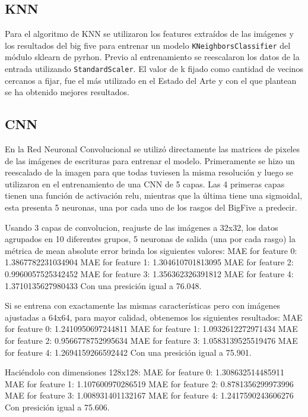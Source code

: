 \documentclass[10pt, a4paper]{article}
\begin{document}
        \subsection{KNN}
            Para el algoritmo de KNN se utilizaron los features extra\'idos de las im\'agenes y los resultados del big five para entrenar un modelo \texttt{KNeighborsClassifier} del m\'odulo sklearn de pyrhon. 
            Previo al entrenamiento se reescalaron los datos de la entrada utilizando \texttt{StandardScaler}. El valor de k fijado como cantidad de vecinos cercanos a fijar, fue el m\'as utilizado en el Estado del Arte y
            con el que plantean se ha obtenido mejores resultados.
        
            \subsection{CNN}
            En la Red Neuronal Convolucional se utiliz\'o directamente las matrices de pixeles de las im\'agenes de escrituras para entrenar el modelo. 
            Primeramente se hizo un reescalado de la imagen para que todas tuviesen la misma resoluci\'on y luego se utilizaron en el entrenamiento de una CNN de 5 capas.
            Las 4 primeras capas tienen una funci\'on de activaci\'on relu, mientras que la \'ultima tiene una sigmoidal, esta presenta 5 neuronas, una por cada uno de los rasgos del BigFive a predecir.
            
            Usando 3 capas de convolucion, reajuste de las im\'agenes a 32x32, los datos agrupados en 10 diferentes grupos, 5 neuronas de salida (una por cada rasgo) la m\'etrica de mean absolute error brinda los siguientes valores:
            MAE for feature 0: 1.3867782231034904
            MAE for feature 1: 1.304610701813095
            MAE for feature 2: 0.9960057525342452
            MAE for feature 3: 1.356362326391812
            MAE for feature 4: 1.3710135627980433
            Con una presici\'on igual a 76.048.

            Si se entrena con exactamente las mismas caracter\'isticas pero con im\'agenes ajustadas a 64x64, para mayor calidad, obtenemos los siguientes resultados:
            MAE for feature 0: 1.2410950697244811
            MAE for feature 1: 1.0932612272971434
            MAE for feature 2: 0.9566778752995634
            MAE for feature 3: 1.0583139525519476
            MAE for feature 4: 1.2694159266592442
            Con una presici\'on igual a 75.901.

            Haci\'endolo con dimensiones 128x128:
            MAE for feature 0: 1.308632514485911
            MAE for feature 1: 1.107600970286519
            MAE for feature 2: 0.8781356299973996
            MAE for feature 3: 1.008931401132167
            MAE for feature 4: 1.2417590243606276
            Con presici\'on igual a 75.606.
\end{document}
